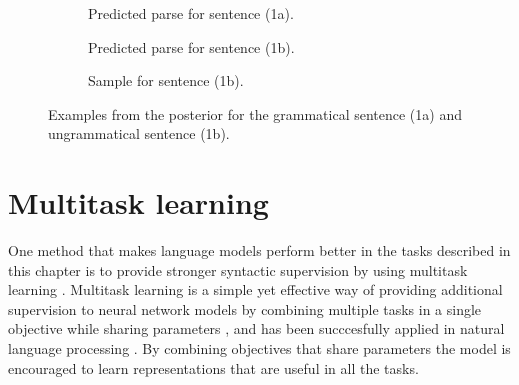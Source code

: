     \begin{figure}[H]

      \begin{subfigure}[b]{\textwidth}
        \center
        \caption{Predicted parse for sentence (1a).}
        \label{fig:syneval-grammatical}
      \end{subfigure}

      \vspace

      \begin{subfigure}[b]{\textwidth}
        \center
        \caption{Predicted parse for sentence (1b).}
        \label{fig:syneval-ungrammatical}
      \end{subfigure}

      \vspace

      \begin{subfigure}[b]{\textwidth}
        \center
        \caption{Sample for sentence (1b).}
        \label{fig:syneval-ungrammatical-sample}
      \end{subfigure}

    \caption{Examples from the posterior for the grammatical sentence (1a) and ungrammatical sentence (1b).}
    \end{figure}

\section{Multitask learning}
  One method that makes language models perform better in the tasks described in this chapter is to provide stronger syntactic supervision by using multitask learning \citep{enguehard2017multitask,linzen2018targeted}. Multitask learning is a simple yet effective way of providing additional supervision to neural network models by combining multiple tasks in a single objective while sharing parameters \citep{caruana1997multitask}, and has been succcesfully applied in natural language processing \citep{collobert2008unified,collobert2011natural,zhang2016multitask,goldberg2016multitask}. By combining objectives that share parameters the model is encouraged to learn representations that are useful in all the tasks.


